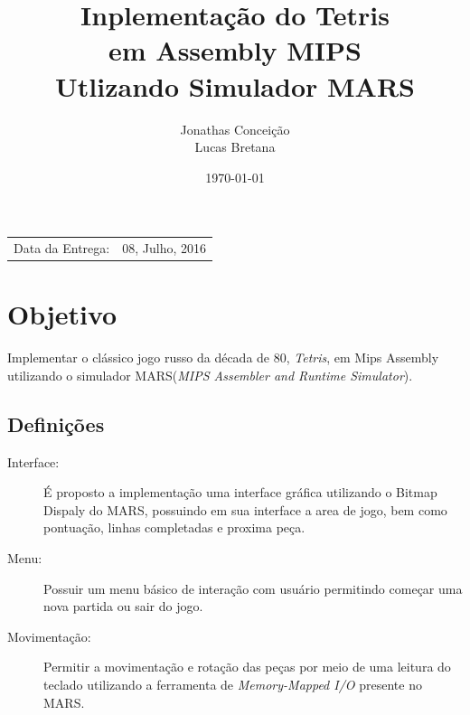 \documentclass{article}
\title{Inplementação do Tetris \\ em Assembly MIPS \\ Utlizando Simulador MARS} %
\author{Jonathas Conceição \\ Lucas Bretana} %
\date{\today} %
\begin{document}
\maketitle %

\begin{center}
\begin{tabular}{l r}
Data da Entrega: & 08, Julho, 2016 \\ %
\end{tabular}
\end{center}



\section{Objetivo}

Implementar o clássico jogo russo da década de 80, \textit{Tetris}, em Mips Assembly utilizando o simulador MARS(\textit{MIPS Assembler and Runtime Simulator}).




\subsection{Definições} \label{definitions}
\begin{description}
  \item[Interface:]
    É proposto a implementação uma interface gráfica utilizando o Bitmap Dispaly do MARS, possuindo em sua interface a area de jogo, bem como pontuação, linhas completadas e proxima peça.
  \item[Menu:]
    Possuir um menu básico de interação com usuário permitindo começar uma nova partida ou sair do jogo.
  \item[Movimentação:]
    Permitir a movimentação e rotação das peças por meio de uma leitura do teclado utilizando a ferramenta de \textit{Memory-Mapped I/O} presente no MARS.
\end{description}
\end{document}
